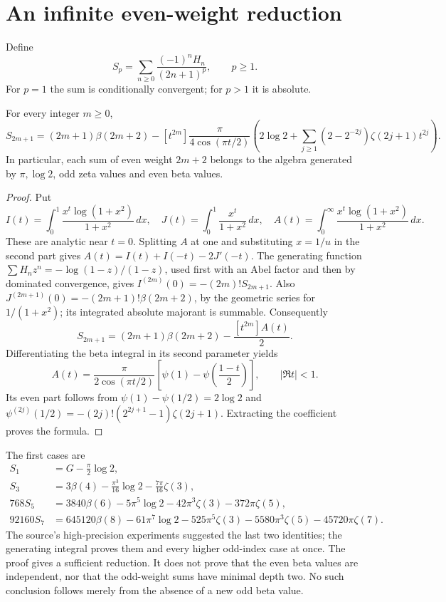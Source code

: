 \section{An infinite even-weight reduction}
Define
\[
S_p=\sum_{n\ge0}\frac{(-1)^nH_n}{(2n+1)^p},\qquad p\ge1.
\]
For $p=1$ the sum is conditionally convergent; for $p>1$ it is absolute.
\begin{theorem}
For every integer $m\ge0$,
\begin{equation}\label{gauss:eq:even-general}
S_{2m+1}=(2m+1)\beta(2m+2)
-[t^{2m}]\frac{\pi}{4\cos(\pi t/2)}
\left(2\log2+\sum_{j\ge1}(2-2^{-2j})\zeta(2j+1)t^{2j}\right).
\end{equation}
In particular, each sum of even weight $2m+2$ belongs to the algebra
generated by $\pi,\log2$, odd zeta values and even beta values.
\end{theorem}
\begin{proof}
Put
\[
I(t)=\int_0^1\frac{x^t\log(1+x^2)}{1+x^2}\,dx,\quad
J(t)=\int_0^1\frac{x^t}{1+x^2}\,dx,\quad
A(t)=\int_0^\infty\frac{x^t\log(1+x^2)}{1+x^2}\,dx.
\]
These are analytic near $t=0$. Splitting $A$ at one and substituting
$x=1/u$ in the second part gives
$A(t)=I(t)+I(-t)-2J'(-t)$.
The generating function $\sum H_nz^n=-\log(1-z)/(1-z)$,
used first with an Abel factor and then by dominated convergence, gives
$I^{(2m)}(0)=-(2m)!S_{2m+1}$.
Also $J^{(2m+1)}(0)=-(2m+1)!\beta(2m+2)$, by the geometric series for
$1/(1+x^2)$; its integrated absolute majorant is summable.
Consequently
\[
S_{2m+1}=(2m+1)\beta(2m+2)-\frac{[t^{2m}]A(t)}2.
\]
Differentiating the beta integral in its second parameter yields
\[
A(t)=\frac{\pi}{2\cos(\pi t/2)}
\left[\psi(1)-\psi\left(\frac{1-t}{2}\right)\right],\qquad |\Re t|<1.
\]
Its even part follows from $\psi(1)-\psi(1/2)=2\log2$ and
$\psi^{(2j)}(1/2)=-(2j)!(2^{2j+1}-1)\zeta(2j+1)$.
Extracting the coefficient proves the formula.
\end{proof}
The first cases are
\begin{align}
S_1&=G-\frac\pi2\log2,\\
S_3&=3\beta(4)-\frac{\pi^3}{16}\log2-\frac{7\pi}{16}\zeta(3),\\
768S_5&=3840\beta(6)-5\pi^5\log2-42\pi^3\zeta(3)-372\pi\zeta(5),\\
92160S_7&=645120\beta(8)-61\pi^7\log2-525\pi^5\zeta(3)
-5580\pi^3\zeta(5)-45720\pi\zeta(7).
\end{align}
The source's high-precision experiments suggested the last two identities;
the generating integral proves them and every higher odd-index case at once.
The proof gives a sufficient reduction. It does not prove that the
even beta values are independent, nor that the odd-weight sums have minimal
depth two. No such conclusion follows merely from the absence of a new
odd beta value.

